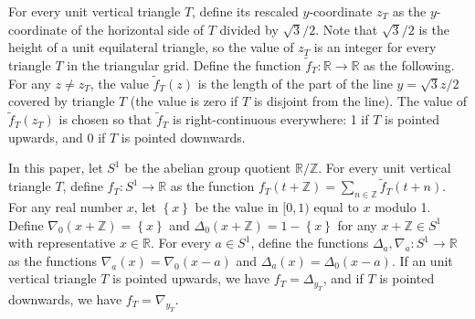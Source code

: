 \documentclass[a4paper]{amsart}
\theoremstyle{plain}
\theoremstyle{definition}
\begin{document}
For every unit vertical triangle \(T\), define its rescaled \(y\)-coordinate \(z_T\) as the \(y\)-coordinate of the horizontal side of $T$ divided by \(\sqrt{3}/2\). Note that \(\sqrt{3}/2\) is the height of a unit equilateral triangle, so the value of \(z_T\) is an integer for every triangle \(T\) in the triangular grid.
Define the function \(\tilde{f}_T : \mathbb{R} \to \mathbb{R}\) as the following. For any \(z \neq z_T\), the value \(\tilde{f}_T(z)\) is the length of the part of the line \(y = \sqrt{3}z / 2\) covered by triangle \(T\) (the value is zero if \(T\) is disjoint from the line). The value of \(\tilde{f}_T(z_T)\) is chosen so that \(\tilde{f}_T\) is right-continuous everywhere: 1 if \(T\) is pointed upwards, and 0 if \(T\) is pointed downwards.

In this paper, let \(S^1\) be the abelian group quotient \(\mathbb{R} /\mathbb{Z}\). For every unit vertical triangle \(T\), define \(f_T : S^1 \to \mathbb{R}\) as the function \(f_T(t + \mathbb{Z}) = \sum_{n \in \mathbb{Z}} \tilde{f}_T(t + n)\).
For any real number \(x\), let \(\left\{ x \right\}\) be the value in \([0, 1)\) equal to \(x\) modulo 1.
Define \(\nabla_0 (x + \mathbb{Z}) = \left\{ x \right\}\) 
and \(\Delta_0 (x + \mathbb{Z}) = 1 - \left\{ x \right\}\) for any \(x + \mathbb{Z} \in S^1\) with representative $x \in \mathbb{R}$.
For every \(a \in S^1\), define the functions \(\Delta_a , \nabla_a : S^1 \to \mathbb{R}\) as the functions \(\nabla_a(x) = \nabla_0(x-a)\) and \(\Delta_a(x) = \Delta_0(x-a)\). If an unit vertical triangle \(T\) is pointed upwards, we have \(f_T = \Delta_{y_T}\), and if \(T\) is pointed downwards, we have \(f_T = \nabla_{y_T}\). 
\end{document}
